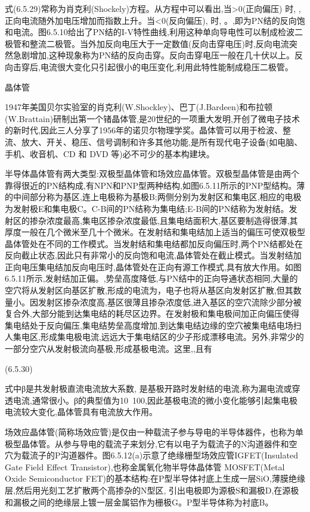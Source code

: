 式(6.5.29)常称为肖克利(Shockely)方程。从方程中可以看出,当>0(正向偏压) 时, ,正向电流随外加电压增加而指数上升。当<0(反向偏压), 时, 。,即为PN结的反向饱和电流。图6.5.10给出了PN结的I-V特性曲线,利用这种单向导电性可以制成检波二极管和整流二极管。当外加反向电压大于一定数值(反向击穿电压)时,反向电流突然急剧增加,这种现象称为PN结的反向击穿。反向击穿电压一般在几十伏以上。反向击穿后,电流很大变化只引起很小的电压变化,利用此特性能制成稳压二极管。



晶体管

1947年美国贝尔实验室的肖克利(W.Shockley)、巴丁(J.Bardeen)和布拉顿(W.Brattain)研制出第一个锗晶体管,是20世纪的一项重大发明,开创了微电子技术的新时代,因此三人分享了1956年的诺贝尔物理学奖。晶体管可以用于检波、整流、放大、开关、稳压、信号调制和许多其他功能,是所有现代电子设备(如电脑、手机、收音机、CD 和 DVD 等)必不可少的基本构建块。

半导体晶体管有两大类型:双极型晶体管和场效应晶体管。双极型晶体管是由两个靠得很近的PN结构成,有NPN和PNP型两种结构,如图6.5.11所示的PNP型结构。薄的中间部分称为基区,连上电极称为基极B;两侧分别为发射区和集电区,相应的电极为发射极E和集电极C。C-B间的PN结称为集电结;E-B间的PN结称为发射结。发射区的掺杂浓度最高,集电区掺杂浓度最低,且集电结面积大,基区要制造得很薄,其厚度一般在几个微米至几十个微米。在发射结和集电结加上适当的偏压可使双极型晶体管处在不同的工作模式。当发射结和集电结都加反向偏压时,两个PN结都处在反向截止状态,因此只有非常小的反向饱和电流,晶体管处在截止模式。当发射结加正向电压集电结加反向电压时,晶体管处在正向有源工作模式,具有放大作用。如图6.5.11所示,发射结加正偏。,势垒高度降低,与PN结中的正向导通状态相同,大量的空穴将从发射区向基区扩散,形成的电流为，电子也将从基区向发射区扩散,但其数量小。因发射区掺杂浓度高,基区很薄且掺杂浓度低,进入基区的空穴流除少部分被复合外,大部分能到达集电结的耗尽区边界。在发射极和集电极间加正向偏压使得集电结处于反向偏压,集电结势垒高度增加,到达集电结边缘的空穴被集电结电场扫人集电区,形成集电极电流,远远大于集电结区的少子形成漂移电流。另外,非常少的一部分空穴从发射极流向基极,形成基极电流。这里,,且有

 	(6.5.30)

式中β是共发射极直流电流放大系数, 是基极开路时发射结的电流,称为漏电流或穿透电流,通常很小。β的典型值为10~100,因此基极电流的微小变化能够引起集电极电流较大变化,晶体管具有电流放大作用。



场效应晶体管(简称场效应管)是仅由一种载流子参与导电的半导体器件，也称为单极型晶体管。从参与导电的载流子来划分,它有以电子为载流子的N沟道器件和空穴为载流子的P沟道器件。图6.5.12(a)示意了绝缘栅型场效应管IGFET(Insulated Gate Field Effect Transistor),也称金属氧化物半导体晶体管 MOSFET(Metal Oxide Semiconductor FET)的基本结构:在P型半导体衬底上生成一层SiO,薄膜绝缘层,然后用光刻工艺扩散两个高掺杂的N型区, 引出电极即为源极S和漏极D,在源极和漏极之间的绝缘层上镀一层金属铝作为栅极G。P型半导体称为衬底B。



